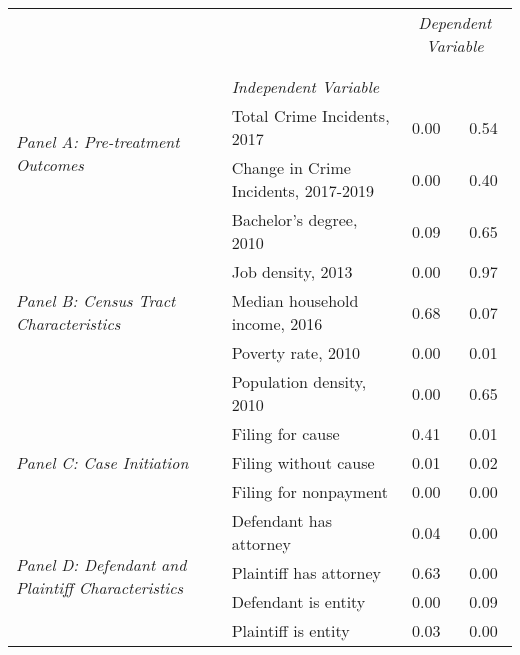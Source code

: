 \begin{tabular}{llcc}
\toprule
 &  & \multicolumn{2}{c}{\textit{Dependent Variable}} \\
\cline{3-4}
\\
 &  &  &  \\
 & \emph{Independent Variable} &  &  \\
\midrule
\multirow[c]{2}{3cm}{\textit{Panel A: Pre-treatment Outcomes}} & Total Crime Incidents, 2017 & 0.00 & 0.54 \\
 & Change in Crime Incidents, 2017-2019 & 0.00 & 0.40 \\
\cline{1-4}
\multirow[c]{5}{3cm}{\textit{Panel B: Census Tract Characteristics}} & Bachelor's degree, 2010 & 0.09 & 0.65 \\
 & Job density, 2013 & 0.00 & 0.97 \\
 & Median household income, 2016 & 0.68 & 0.07 \\
 & Poverty rate, 2010 & 0.00 & 0.01 \\
 & Population density, 2010 & 0.00 & 0.65 \\
\cline{1-4}
\multirow[c]{3}{3cm}{\textit{Panel C: Case Initiation}} & Filing for cause & 0.41 & 0.01 \\
 & Filing without cause & 0.01 & 0.02 \\
 & Filing for nonpayment & 0.00 & 0.00 \\
\cline{1-4}
\multirow[c]{4}{3cm}{\textit{Panel D: Defendant and Plaintiff Characteristics}} & Defendant has attorney & 0.04 & 0.00 \\
 & Plaintiff has attorney & 0.63 & 0.00 \\
 & Defendant is entity & 0.00 & 0.09 \\
 & Plaintiff is entity & 0.03 & 0.00 \\
\cline{1-4}
\bottomrule
\end{tabular}
